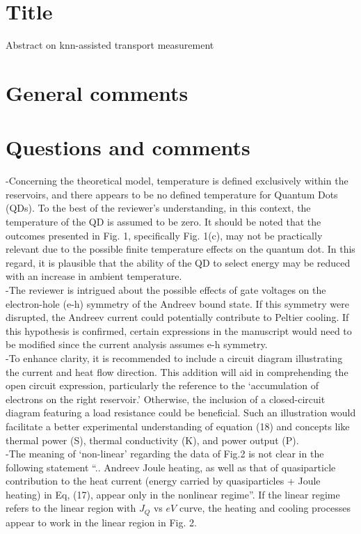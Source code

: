\documentclass[aip,graphicx,preprint]{revtex4-1}
\begin{document}


\section*{Title}
Abstract on knn-assisted transport measurement


\section{General comments}

\section{Questions and comments}
-Concerning the theoretical model, temperature is defined exclusively within the reservoirs, and there appears to be no defined temperature for Quantum Dots (QDs). To the best of the reviewer's understanding, in this context, the temperature of the QD is assumed to be zero. It should be noted that the outcomes presented in Fig. 1, specifically Fig. 1(c), may not be practically relevant due to the possible finite temperature effects on the quantum dot. In this regard, it is plausible that the ability of the QD to select energy may be reduced with an increase in ambient temperature.\\
-The reviewer is intrigued about the possible effects of gate voltages on the electron-hole (e-h) symmetry of the Andreev bound state. If this symmetry were disrupted, the Andreev current could potentially contribute to Peltier cooling. If this hypothesis is confirmed, certain expressions in the manuscript would need to be modified since the current analysis assumes e-h symmetry.\\
-To enhance clarity, it is recommended to include a circuit diagram illustrating the current and heat flow direction. This addition will aid in comprehending the open circuit expression, particularly the reference to the `accumulation of electrons on the right reservoir.' Otherwise, the inclusion of a closed-circuit diagram featuring a load resistance could be beneficial. Such an illustration would facilitate a better experimental understanding of equation (18) and concepts like thermal power (S), thermal conductivity (K), and power output (P).\\
-The meaning of `non-linear' regarding the data of Fig.2 is not clear in the following statement ``.. Andreev Joule heating, as well as that of quasiparticle contribution to the heat current (energy carried by quasiparticles + Joule heating) in Eq, (17), appear only in the nonlinear regime''. If the linear regime refers to the linear region with $J_Q$ vs $eV$ curve, the heating and cooling processes appear to work in the linear region in Fig. 2.\\
\end{document}
